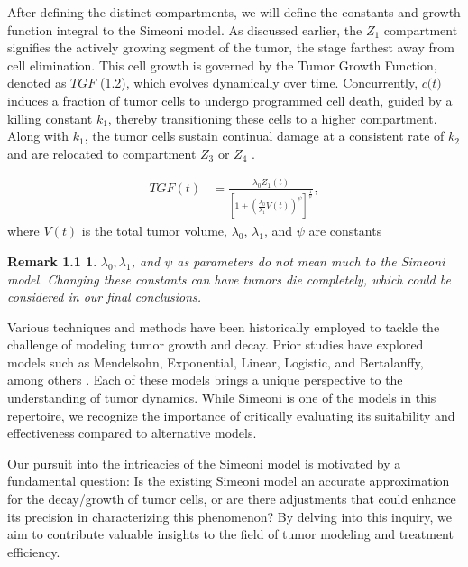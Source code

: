 \documentclass[11pt]{amsart}
\newtheorem*{remark}{Remark 1.1}
\begin{document}
After defining the distinct compartments, we will define the constants and growth function integral to the Simeoni model. As discussed earlier, the $Z_1$ compartment signifies the actively growing segment of the tumor, the stage farthest away from cell elimination. This cell growth is governed by the Tumor Growth Function, denoted as $TGF$ (1.2), which evolves dynamically over time. Concurrently, $c$$($$t$$)$ induces a fraction of tumor cells to undergo programmed cell death, guided by a killing constant 
$k_1$, thereby transitioning these cells to a higher compartment. Along with $k_1$,  the tumor cells sustain continual damage at a consistent rate of $k_2$ and are relocated to compartment $Z_3$ or $Z_4$ \cite{Koziol_Falls_Schnitzer_2020}.


\begin{equation}
\begin{aligned}
    TGF(t) &= \frac{\lambda_0Z_1(t)}{[1 + (\frac{\lambda_0}{\lambda_1}V(t))^\psi]^\frac{1}{\psi}}, 
\end{aligned}
\tag*{(1.2)}
\end{equation}
\qquad where $V(t)$ is the total tumor volume, $\lambda_0$, $\lambda_1$, and $\psi$ are constants %

\begin{remark}
    $\lambda_0, \lambda_1$, and $\psi$ as parameters do not mean much to the Simeoni model. Changing these constants can have tumors die completely, which could be considered in our final conclusions.
\end{remark}

Various techniques and methods have been historically employed to tackle the challenge of modeling tumor growth and decay. Prior studies have explored models such as Mendelsohn, Exponential, Linear, Logistic, and Bertalanffy, among others \cite{Murphy_Hope_2016}. Each of these models brings a unique perspective to the understanding of tumor dynamics. While Simeoni is one of the models in this repertoire, we recognize the importance of critically evaluating its suitability and effectiveness compared to alternative models.

Our pursuit into the intricacies of the Simeoni model is motivated by a fundamental question: Is the existing Simeoni model an accurate approximation for the decay/growth of tumor cells, or are there adjustments that could enhance its precision in characterizing this phenomenon? By delving into this inquiry, we aim to contribute valuable insights to the field of tumor modeling and treatment efficiency.
\end{document}

